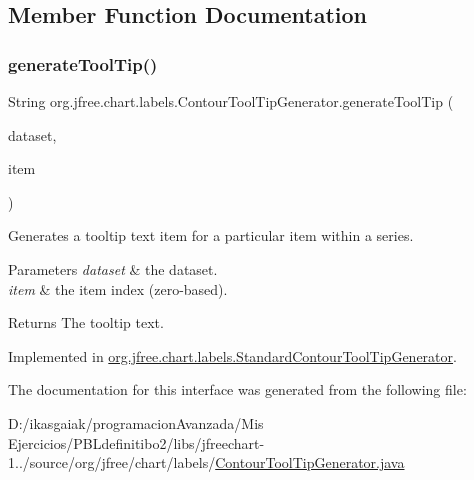 \subsection{Member Function Documentation}
\mbox{\label{interfaceorg_1_1jfree_1_1chart_1_1labels_1_1_contour_tool_tip_generator_a667a729e1865dc84fccab2eff1ed0c9e}} 
\subsubsection{\texorpdfstring{generate\+Tool\+Tip()}{generateToolTip()}}
{\footnotesize\ttfamily String org.\+jfree.\+chart.\+labels.\+Contour\+Tool\+Tip\+Generator.\+generate\+Tool\+Tip (\begin{DoxyParamCaption}\item[{\mbox{\hyperlink{interfaceorg_1_1jfree_1_1data_1_1contour_1_1_contour_dataset}{Contour\+Dataset}}}]{dataset,  }\item[{int}]{item }\end{DoxyParamCaption})}

Generates a tooltip text item for a particular item within a series.


\begin{DoxyParams}{Parameters}
{\em dataset} & the dataset. \\
\hline
{\em item} & the item index (zero-\/based).\\
\hline
\end{DoxyParams}
\begin{DoxyReturn}{Returns}
The tooltip text. 
\end{DoxyReturn}


Implemented in \mbox{\hyperlink{classorg_1_1jfree_1_1chart_1_1labels_1_1_standard_contour_tool_tip_generator_a4ea1b394b13eb58a34d5dd86fa26ca86}{org.\+jfree.\+chart.\+labels.\+Standard\+Contour\+Tool\+Tip\+Generator}}.



The documentation for this interface was generated from the following file\+:\begin{DoxyCompactItemize}
\item 
D\+:/ikasgaiak/programacion\+Avanzada/\+Mis Ejercicios/\+P\+B\+Ldefinitibo2/libs/jfreechart-\/1../source/org/jfree/chart/labels/\mbox{\hyperlink{_contour_tool_tip_generator_8java}{Contour\+Tool\+Tip\+Generator.\+java}}\end{DoxyCompactItemize}
